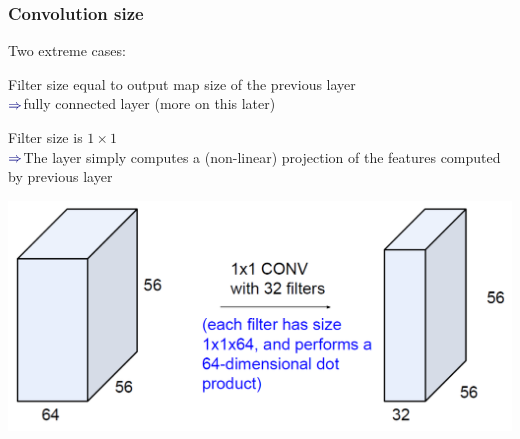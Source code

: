 \documentclass[xcolor=dvipsnames]{beamer}
\newcommand{\myar}{$\textcolor{blue!50!black}{\Rightarrow}$}
\begin{document}
\begin{frame}
  \frametitle{Convolution size}
  \bi
\item Two extreme cases:
\item Filter size equal to output map size of the previous layer\\
\myar fully connected layer (more on this later)
\item Filter size is $1\times1$\\
\myar The layer simply computes a (non-linear) projection of the features
computed by previous layer

\includegraphics[width=.6\textwidth]{ak-1x1conv}
\ei
\end{frame}
\end{document}
